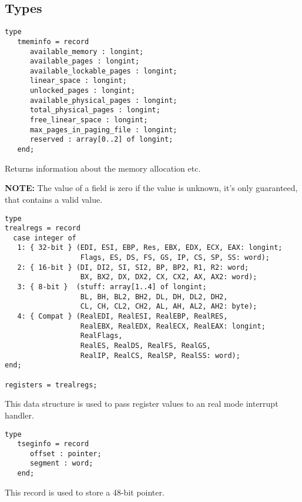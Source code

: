 \subsection{Types}
\begin{verbatim}
type 
   tmeminfo = record 
      available_memory : longint;
      available_pages : longint;
      available_lockable_pages : longint;
      linear_space : longint;
      unlocked_pages : longint;
      available_physical_pages : longint;
      total_physical_pages : longint;
      free_linear_space : longint;
      max_pages_in_paging_file : longint;
      reserved : array[0..2] of longint;
   end;
\end{verbatim}\label{ty:tmeminfo}
Returns information about the memory allocation etc.

\textbf {NOTE:} The
value of a field is zero if the value is unknown, it's only guaranteed,
that  contains a valid value.
\begin{verbatim}
type
trealregs = record
  case integer of
   1: { 32-bit } (EDI, ESI, EBP, Res, EBX, EDX, ECX, EAX: longint;
                  Flags, ES, DS, FS, GS, IP, CS, SP, SS: word);
   2: { 16-bit } (DI, DI2, SI, SI2, BP, BP2, R1, R2: word;
                  BX, BX2, DX, DX2, CX, CX2, AX, AX2: word);
   3: { 8-bit }  (stuff: array[1..4] of longint;
                  BL, BH, BL2, BH2, DL, DH, DL2, DH2,
                  CL, CH, CL2, CH2, AL, AH, AL2, AH2: byte);
   4: { Compat } (RealEDI, RealESI, RealEBP, RealRES,
                  RealEBX, RealEDX, RealECX, RealEAX: longint;
                  RealFlags,
                  RealES, RealDS, RealFS, RealGS,
                  RealIP, RealCS, RealSP, RealSS: word);
end;

registers = trealregs;
\end{verbatim}\label{ty:trealregs}
This data structure is used to pass register values to an real mode
interrupt handler.
\begin{verbatim}
type
   tseginfo = record 
      offset : pointer;
      segment : word;
   end;
\end{verbatim}\label{ty:tseginfo}
This record is used to store a 48-bit pointer.

